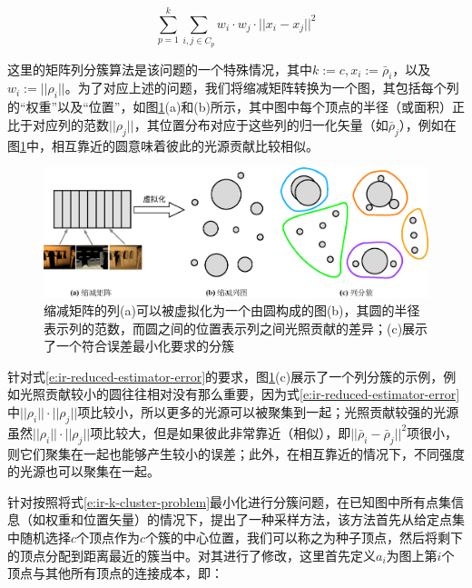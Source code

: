 \begin{equation}\label{e:ir-k-cluster-problem}
	\sum^{k}_{p=1}\sum_{i,j\in C_p}w_i\cdot w_j\cdot||x_i-x_j||^{2}
\end{equation}

\noindent 这里的矩阵列分簇算法是该问题的一个特殊情况，其中$k:=c,x_i:=\bar{\rho}_i$，以及$w_i:=||\rho_i||$。为了对应上述的问题，我们将缩减矩阵转换为一个图，其包括每个列的“权重”以及“位置”，如图\ref{f:ir-reduced-columns}(a)和(b)所示，其中图中每个顶点的半径（或面积）正比于对应列的范数$||\rho_j||$，其位置分布对应于这些列的归一化矢量（如$\bar{\rho}_j$），例如在图\ref{f:ir-reduced-columns}中，相互靠近的圆意味着彼此的光源贡献比较相似。

\begin{figure}
\begin{fullwidth}
	\includegraphics[width=1.0\thewidth]{figures/ir/reduced-columns}
	\caption{缩减矩阵的列(a)可以被虚拟化为一个由圆构成的图(b)，其圆的半径表示列的范数，而圆之间的位置表示列之间光照贡献的差异；(c)展示了一个符合误差最小化要求的分簇}
	\label{f:ir-reduced-columns}
\end{fullwidth}
\end{figure}

针对式\ref{e:ir-reduced-estimator-error}的要求，图\ref{f:ir-reduced-columns}(c)展示了一个列分簇的示例，例如光照贡献较小的圆往往相对没有那么重要，因为式\ref{e:ir-reduced-estimator-error}中$||\rho_i||\cdot||\rho_j||$项比较小，所以更多的光源可以被聚集到一起；光照贡献较强的光源虽然$||\rho_i||\cdot||\rho_j||$项比较大，但是如果彼此非常靠近（相似），即$||\bar{\rho}_i-\bar{\rho}_j||^{2}$项很小，则它们聚集在一起也能够产生较小的误差；此外，在相互靠近的情况下，不同强度的光源也可以聚集在一起。

针对按照将式\ref{e:ir-k-cluster-problem}最小化进行分簇问题，在已知图中所有点集信息（如权重和位置矢量）的情况下，\cite{a:ClusteredDeferredandForwardShading}提出了一种采样方法，该方法首先从给定点集中随机选择$c$个顶点作为$c$个簇的中心位置，我们可以称之为种子顶点，然后将剩下的顶点分配到距离最近的簇当中。\cite{a:MatrixRow-ColumnSamplingfortheMany-LightProblem}对其进行了修改，这里首先定义$a_i$为图上第$i$个顶点与其他所有顶点的连接成本，即：

